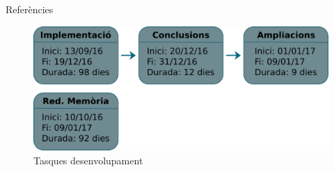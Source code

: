 \documentclass[xcolor=table]{beamer}
\begin{document}
	\begin{frame}{Referències}
		\centering
		\begin{figure}
			\includegraphics[width=\textwidth-1cm]{tasques}
			\vspace{0.2cm}
			\caption{Tasques desenvolupament}
		\end{figure}
	\end{frame}
\end{document}
